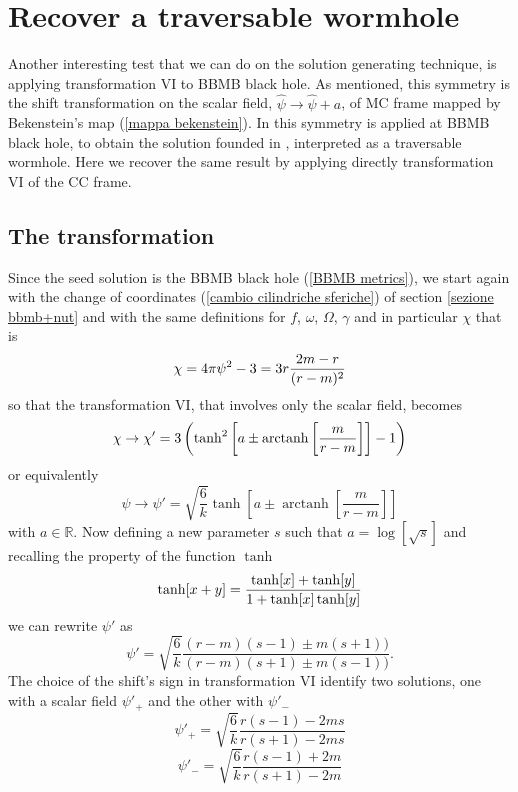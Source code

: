 
\chapter{Recover a traversable wormhole} \label{appendice B}
Another interesting test that we can do on the solution generating technique, is applying transformation VI to BBMB black hole. As mentioned, this symmetry is the shift transformation on the scalar field, $\hat{\psi} \rightarrow \hat{\psi}+a$, of MC frame mapped by Bekenstein's map (\ref{mappa bekenstein}). In \citep{stationary} this symmetry is applied at BBMB black hole, to obtain the solution founded in \citep{Barcelo_Visser}, interpreted as a traversable wormhole. Here we recover the same result by applying directly transformation VI of the CC frame.

\section{The transformation}
Since the seed solution is the BBMB black hole (\ref{BBMB metrics}), we start again with the change of coordinates (\ref{cambio cilindriche sferiche}) of section \ref{sezione bbmb+nut} and with the same definitions for $f$, $\omega$, $\Omega$, $\gamma$ and in particular $\chi$ that is 
\begin{equation}
    \chi =4\pi\psi^2-3= 3r\frac{2m-r}{(r-m)^2}
    \notag
\end{equation}
so that the transformation VI, that involves only the scalar field, becomes
\begin{equation}
    \chi \rightarrow \chi' = 3\left(\tanh^2\left[a \pm \operatorname{arctanh} \left[ \frac{m}{r-m}\right]\right] - 1\right) \notag
\end{equation}
or equivalently
\begin{equation}
    \psi \rightarrow \psi' = \sqrt{\frac{6}{k}}\tanh\left[a \pm \operatorname{arctanh} \left[ \frac{m}{r-m}\right]\right]
    \label{psi nel wormhole}
\end{equation}
with $a\in\mathbb{R}$. Now defining a new parameter $s$ such that $a=\log[\sqrt{s}]$
and recalling the property of the function $\tanh$
\begin{equation}
    \tanh[x+y] = \frac{\tanh[x]+\tanh[y]}{1+\tanh[x]\tanh[y]} \notag
\end{equation}
we can rewrite $\psi'$ as 
\begin{equation}
    \psi' = \sqrt{\frac{6}{k}}\frac{(r-m)(s-1)\pm m(s+1))}{(r-m)(s+1)\pm m(s-1))}.
\end{equation}
The choice of the shift's sign in transformation VI identify two solutions, one with a scalar field $\psi'_+$ and the other with $\psi'_-$
\begin{equation}
    \psi'_+ = \sqrt{\frac{6}{k}}\frac{r(s-1)- 2ms}{r(s+1)- 2ms}
\end{equation}
\begin{equation}
    \psi'_- = \sqrt{\frac{6}{k}}\frac{r(s-1)+ 2m}{r(s+1)- 2m}
\end{equation}

